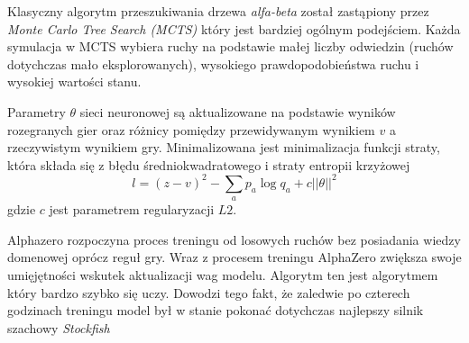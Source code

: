 Klasyczny algorytm przeszukiwania drzewa \textit{alfa-beta} został zastąpiony przez \textit{Monte Carlo Tree Search (MCTS)}
który jest bardziej ogólnym podejściem. Każda symulacja w MCTS wybiera ruchy na podstawie małej liczby odwiedzin (ruchów dotychczas mało eksplorowanych),
 wysokiego prawdopodobieństwa ruchu i wysokiej wartości stanu.

 Parametry $\theta$ sieci neuronowej są aktualizowane na podstawie wyników rozegranych gier oraz różnicy pomiędzy 
 przewidywanym wynikiem $v$ a rzeczywistym wynikiem gry. Minimalizowana jest minimalizacja funkcji straty, która składa 
 się z błędu średniokwadratowego i straty entropii krzyżowej 
 \begin{equation*}
    l = (z-v)^{2} - \sum_{a} p_{a} \log{q_{a} + c ||\theta||^{2}}
 \end{equation*}
 gdzie $c$ jest parametrem regularyzacji $L2$.

 Alphazero rozpoczyna proces treningu od losowych ruchów bez posiadania wiedzy domenowej oprócz reguł gry. Wraz z procesem 
 treningu AlphaZero zwiększa swoje umięjętności wskutek aktualizacji wag modelu. Algorytm ten jest algorytmem który bardzo szybko 
 się uczy. Dowodzi tego fakt, że zaledwie po czterech godzinach treningu model był w stanie pokonać dotychczas najlepszy 
 silnik szachowy \textit{Stockfish}